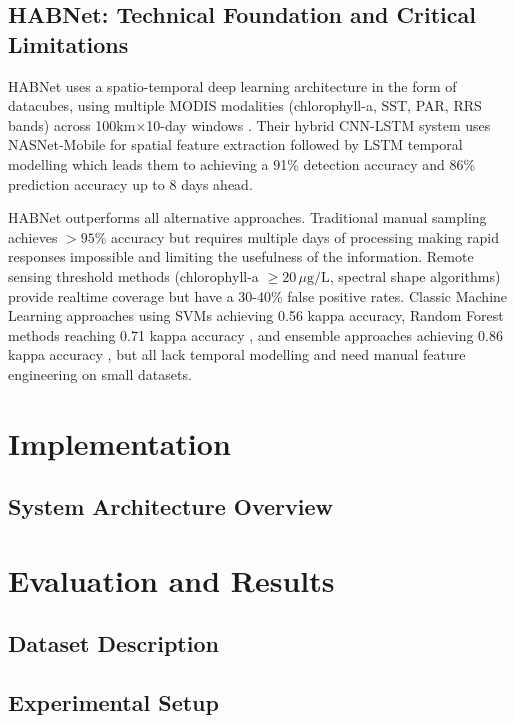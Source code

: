 \documentclass[conference]{IEEEtran}
\begin{document}
\subsection{HABNet: Technical Foundation and Critical Limitations}
HABNet uses a spatio-temporal deep learning architecture in the form of datacubes, using multiple MODIS modalities (chlorophyll-a, SST, PAR, RRS bands) across 100km×10-day windows \cite{b1}. Their hybrid CNN-LSTM system uses NASNet-Mobile for spatial feature extraction followed by LSTM temporal modelling which leads them to achieving a 91\% detection accuracy and 86\% prediction accuracy up to 8 days ahead.

HABNet outperforms all alternative approaches. Traditional manual sampling achieves $>95\%$ accuracy but requires multiple days of processing making rapid responses impossible and limiting the usefulness of the information. Remote sensing threshold methods (chlorophyll-a $\geq 20\,\mu\text{g/L}$, spectral shape algorithms) provide realtime coverage but have a 30-40\% false positive rates. Classic Machine Learning approaches using SVMs achieving 0.56 kappa accuracy\cite{b2}, Random Forest methods reaching 0.71 kappa accuracy \cite{b2}, and ensemble approaches achieving 0.86 kappa accuracy \cite{b3}, but all lack temporal modelling and need manual feature engineering on small datasets.



\section{Implementation}

\subsection{System Architecture Overview}


\section{Evaluation and Results}

\subsection{Dataset Description}

\subsection{Experimental Setup}
\end{document}
